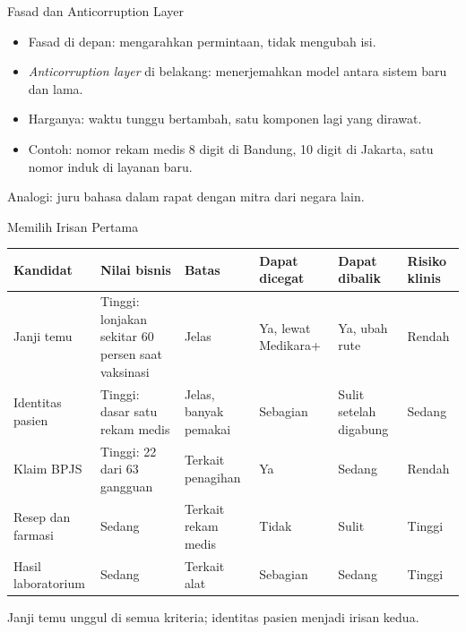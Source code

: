 \documentclass[aspectratio=169, table, 12pt]{beamer}
\begin{document}
\begin{frame}{{\Large Fasad dan Anticorruption Layer}}
  \vspace{10pt}
  \begin{itemize}
    \item Fasad di depan: mengarahkan permintaan, tidak mengubah isi.
    \item \textit{Anticorruption layer} di belakang: menerjemahkan model antara sistem baru dan lama.
    \item Harganya: waktu tunggu bertambah, satu komponen lagi yang dirawat.
    \item Contoh: nomor rekam medis 8 digit di Bandung, 10 digit di Jakarta, satu nomor induk di
          layanan baru.
  \end{itemize}
  \vspace{6pt}
  {\small Analogi: juru bahasa dalam rapat dengan mitra dari negara lain.}
\end{frame}

\begin{frame}{{\Large Memilih Irisan Pertama}}
  \footnotesize
  \begin{tabularx}{\textwidth}{>{\raggedright\arraybackslash}p{2.1cm}
      >{\raggedright\arraybackslash}X >{\raggedright\arraybackslash}p{2.0cm}
      >{\raggedright\arraybackslash}p{1.9cm} >{\raggedright\arraybackslash}p{1.8cm}
      >{\raggedright\arraybackslash}p{1.1cm}}
    \hline
    \textbf{Kandidat} & \textbf{Nilai bisnis} & \textbf{Batas} & \textbf{Dapat dicegat} &
      \textbf{Dapat dibalik} & \textbf{Risiko klinis} \\ \hline
    Janji temu & Tinggi: lonjakan sekitar 60 persen saat vaksinasi & Jelas & Ya, lewat Medikara+ &
      Ya, ubah rute & Rendah \\ \hline
    Identitas pasien & Tinggi: dasar satu rekam medis & Jelas, banyak pemakai & Sebagian & Sulit
      setelah digabung & Sedang \\ \hline
    Klaim BPJS & Tinggi: 22 dari 63 gangguan & Terkait penagihan & Ya & Sedang & Rendah \\ \hline
    Resep dan farmasi & Sedang & Terkait rekam medis & Tidak & Sulit & Tinggi \\ \hline
    Hasil laboratorium & Sedang & Terkait alat & Sebagian & Sedang & Tinggi \\ \hline
  \end{tabularx}

  \vspace{8pt}
  \small Janji temu unggul di semua kriteria; identitas pasien menjadi irisan kedua.
\end{frame}
\end{document}
